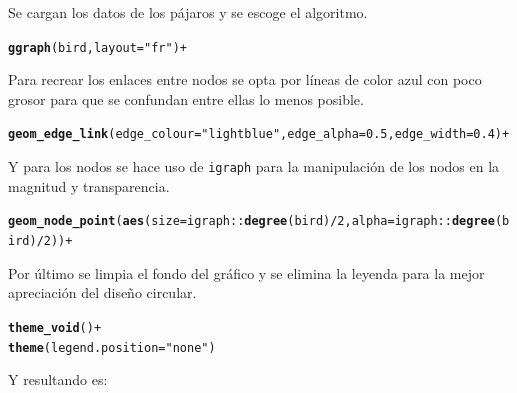 \documentclass{article}\usepackage[]{graphicx}\usepackage[]{color}
\makeatletter
\newcommand{\hlstr}[1]{\textcolor[rgb]{0.192,0.494,0.8}{#1}}%
\newcommand{\hlopt}[1]{\textcolor[rgb]{0,0,0}{#1}}%
\newcommand{\hlstd}[1]{\textcolor[rgb]{0.345,0.345,0.345}{#1}}%
\newcommand{\hlkwc}[1]{\textcolor[rgb]{0.333,0.667,0.333}{#1}}%
\newcommand{\hlkwd}[1]{\textcolor[rgb]{0.737,0.353,0.396}{\textbf{#1}}}%
\newenvironment{kframe}{%
 \def\at@end@of@kframe{}%
 \ifinner\ifhmode%
  \def\at@end@of@kframe{\end{minipage}}%
  \begin{minipage}{\columnwidth}%
 \fi\fi%
 \def\FrameCommand##1{\hskip\@totalleftmargin \hskip-\fboxsep
 \colorbox{shadecolor}{##1}\hskip-\fboxsep
     \hskip-\linewidth \hskip-\@totalleftmargin \hskip\columnwidth}%
 \MakeFramed {\advance\hsize-\width
   \@totalleftmargin\z@ \linewidth\hsize
   \@setminipage}}%
 {\par\unskip\endMakeFramed%
 \at@end@of@kframe}
\newenvironment{knitrout}{}{} %
\makeatother
\begin{document}
Se cargan los datos de los p\'ajaros y se escoge el algoritmo.
\begin{knitrout}
\color{fgcolor}\begin{kframe}
\begin{alltt}
\hlkwd{ggraph}(bird, layout =\hlstr{"fr"}) + 
\end{alltt}
\end{kframe}
\end{knitrout}
Para recrear los enlaces entre nodos se opta por l\'ineas de color azul con poco grosor para que se confundan entre ellas lo menos posible.
\begin{knitrout}
\color{fgcolor}\begin{kframe}
\begin{alltt}
  \hlkwd{geom_edge_link}(edge_colour=\hlstr{"lightblue"}, edge_alpha=0.5, edge_width=0.4) +
\end{alltt}
\end{kframe}
\end{knitrout}
Y para los nodos se hace uso de \texttt{igraph} para la manipulaci\'on de los nodos en la magnitud y transparencia.
\begin{knitrout}
\color{fgcolor}\begin{kframe}
\begin{alltt}
  \hlkwd{geom_node_point}(\hlkwd{aes}(size = igraph::\hlkwd{degree}(bird)/2, alpha = igraph::\hlkwd{degree}(bird)/2)) +
\end{alltt}
\end{kframe}
\end{knitrout}
Por \'ultimo se limpia el fondo del gr\'afico y se elimina la leyenda para la mejor apreciaci\'on del dise\~no circular.
\begin{knitrout}
\color{fgcolor}\begin{kframe}
\begin{alltt}
  \hlkwd{theme_void}\hlstd{()} \hlopt{+}
  \hlkwd{theme}\hlstd{(} \hlkwc{legend.position} \hlstd{=} \hlstr{"none"}\hlstd{)}
\end{alltt}
\end{kframe}
\end{knitrout}
\clearpage
Y resultando es:
\end{document}
